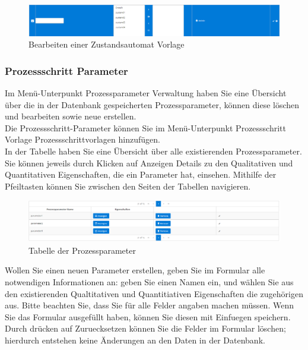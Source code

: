 \documentclass[enabledeprecatedfontcommands,fontsize=12pt,paper=a4,twoside]{scrartcl}
\begin{document}
\begin{figure}[h!]
\begin{center}
 \includegraphics[width=\textwidth]{screenshots/pk/prozessschrittzustandsautomatvorlageedit.png}
  \caption{Bearbeiten einer Zustandsautomat Vorlage}
  \label{fig:boat2}
\end{center}
\end{figure}

\subsubsection{Prozessschritt Parameter}

Im Menü-Unterpunkt Prozessparameter Verwaltung haben Sie eine Übersicht über die in der Datenbank gespeicherten Prozessparameter, können diese löschen und bearbeiten sowie neue erstellen. \\

Die Prozessschritt-Parameter können Sie im Menü-Unterpunkt Prozessschritt Vorlage Prozessschrittvorlagen hinzufügen. \\

In der Tabelle haben Sie eine Übersicht über alle existierenden Prozessparameter. Sie können jeweils durch Klicken auf Anzeigen Details zu den Qualitativen und Quantitativen Eigenschaften, die ein Parameter hat, einsehen. Mithilfe der Pfeiltasten können Sie zwischen den Seiten der Tabellen navigieren. \\


\begin{figure}[h!]
\begin{center}
 \includegraphics[width=\textwidth]{screenshots/pk/prozessschrittparametertabelle.png}
  \caption{Tabelle der Prozessparameter}
  \label{fig:boat2}
\end{center}
\end{figure}


Wollen Sie einen neuen Parameter erstellen, geben Sie im Formular alle notwendigen Informationen an: geben Sie einen Namen ein, und wählen Sie aus den existierenden Qualtitativen und Quantitiativen Eigenschaften die zugehörigen aus. Bitte beachten Sie, dass Sie für alle Felder angaben machen müssen. Wenn Sie das Formular ausgefüllt haben, können Sie diesen mit Einfuegen speichern. Durch drücken auf Zuruecksetzen können Sie die Felder im Formular löschen; hierdurch entstehen keine Änderungen an den Daten in der Datenbank. \\
\end{document}
